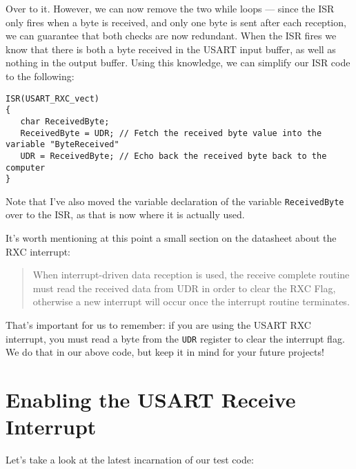 \documentclass[a4paper,oneside]{book}
\begin{document}
Over to it. However, we can now remove the two while loops --- since the ISR only fires when a byte is received, and only one byte is sent after each reception, we can guarantee that both checks are now redundant. When the ISR fires we know that there is both a byte received in the USART input buffer, as well as nothing in the output buffer. Using this knowledge, we can simplify our ISR code to the following:

\begin{center}
\begin{lstlisting}
ISR(USART_RXC_vect)
{
   char ReceivedByte;
   ReceivedByte = UDR; // Fetch the received byte value into the variable "ByteReceived"
   UDR = ReceivedByte; // Echo back the received byte back to the computer
}
\end{lstlisting}
\end{center}

Note that I've also moved the variable declaration of the variable \texttt{ReceivedByte} over to the ISR, as that is now where it is actually used.

It's worth mentioning at this point a small section on the datasheet about the RXC interrupt:

\begin{quote}
When interrupt-driven data reception is used, the receive complete routine must read the received data from UDR in order to clear the RXC Flag, otherwise a new interrupt will occur once the interrupt routine terminates.
\end{quote}

That's important for us to remember: if you are using the USART RXC interrupt, you must read a byte from the \texttt{UDR} register to clear the interrupt flag. We do that in our above code, but keep it in mind for your future projects!


\chapter{Enabling the USART Receive Interrupt}

Let's take a look at the latest incarnation of our test code:
\end{document}
